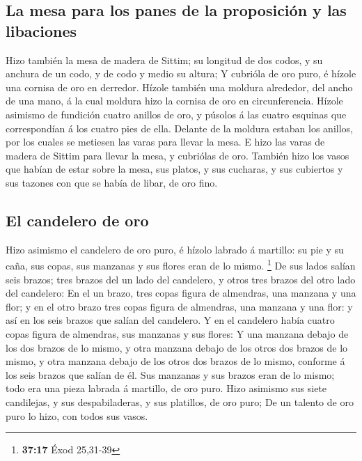 \hypertarget{la-mesa-para-los-panes-de-la-proposiciuxf3n-y-las-libaciones}{%
\subsection{La mesa para los panes de la proposición y las
libaciones}\label{la-mesa-para-los-panes-de-la-proposiciuxf3n-y-las-libaciones}}

 Hizo también la mesa de madera de Sittim; su longitud de
dos codos, y su anchura de un codo, y de codo y medio su altura;
 Y cubrióla de oro puro, é hízole una cornisa de oro en
derredor.  Hízole también una moldura alrededor, del ancho
de una mano, á la cual moldura hizo la cornisa de oro en circunferencia.
 Hízole asimismo de fundición cuatro anillos de oro, y
púsolos á las cuatro esquinas que correspondían á los cuatro pies de
ella.  Delante de la moldura estaban los anillos, por los
cuales se metiesen las varas para llevar la mesa.  E hizo
las varas de madera de Sittim para llevar la mesa, y cubriólas de oro.
 También hizo los vasos que habían de estar sobre la mesa,
sus platos, y sus cucharas, y sus cubiertos y sus tazones con que se
había de libar, de oro fino.

\hypertarget{el-candelero-de-oro}{%
\subsection{El candelero de oro}\label{el-candelero-de-oro}}

 Hizo asimismo el candelero de oro puro, é hízolo labrado á
martillo: su pie y su caña, sus copas, sus manzanas y sus flores eran de
lo mismo. \footnote{\textbf{37:17} Éxod 25,31-39}  De sus
lados salían seis brazos; tres brazos del un lado del candelero, y otros
tres brazos del otro lado del candelero:  En el un brazo,
tres copas figura de almendras, una manzana y una flor; y en el otro
brazo tres copas figura de almendras, una manzana y una flor: y así en
los seis brazos que salían del candelero.  Y en el
candelero había cuatro copas figura de almendras, sus manzanas y sus
flores:  Y una manzana debajo de los dos brazos de lo
mismo, y otra manzana debajo de los otros dos brazos de lo mismo, y otra
manzana debajo de los otros dos brazos de lo mismo, conforme á los seis
brazos que salían de él.  Sus manzanas y sus brazos eran de
lo mismo; todo era una pieza labrada á martillo, de oro puro.
 Hizo asimismo sus siete candilejas, y sus despabiladeras,
y sus platillos, de oro puro;  De un talento de oro puro lo
hizo, con todos sus vasos.

